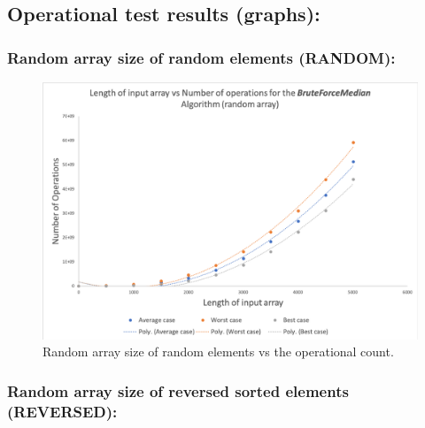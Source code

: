 \documentclass[12pt]{article}
\begin{document}
\begin{table}[H]
	\centering
	\caption{Timing Test - Random array size of sorted elements regression results.}
	\label{tab:sortedTime}
\end{table}


\subsection{Operational test results (graphs):}

\subsubsection{Random array size of random elements (RANDOM): }

\begin{figure}[H]
	\centering
	\includegraphics[width=0.9\linewidth]{Results/OpsRandom}
	\caption{Random array size of random elements vs the operational count.}
	\label{fig:opsrandom}
\end{figure}


\subsubsection{Random array size of reversed sorted elements (REVERSED): }
\end{document}
